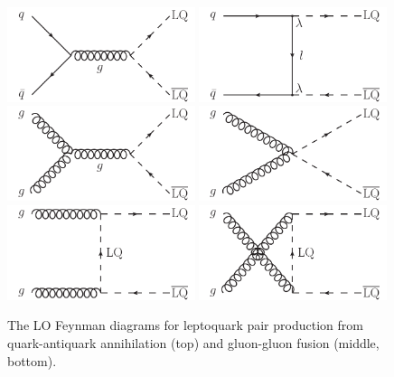 \begin{figure}[hbt]
\begin{center}
\includegraphics[width=0.49\textwidth]{figures/LO_FD_LQ_pair_a.pdf}
\includegraphics[width=0.49\textwidth]{figures/LO_FD_LQ_pair_b.pdf}
\includegraphics[width=0.49\textwidth]{figures/LO_FD_LQ_pair_c.pdf}
\includegraphics[width=0.49\textwidth]{figures/LO_FD_LQ_pair_d.pdf}
\includegraphics[width=0.49\textwidth]{figures/LO_FD_LQ_pair_e.pdf}
\includegraphics[width=0.49\textwidth]{figures/LO_FD_LQ_pair_f.pdf}
\caption{The LO Feynman diagrams for leptoquark pair production from quark-antiquark annihilation (top) and gluon-gluon fusion (middle, bottom).}
\label{fig:lq-diagrams}
\end{center}
\end{figure}

